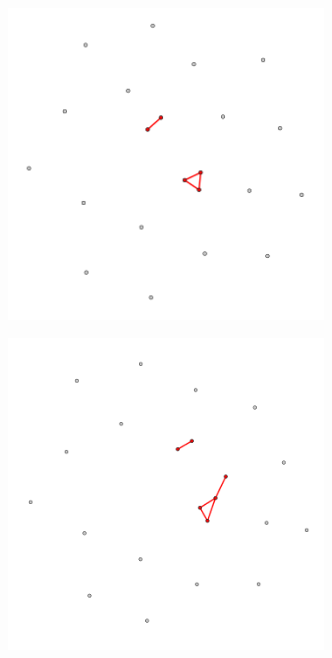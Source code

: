 \begin{figure}[!htbp]
\begin{subfigure}{0.3\textwidth}
        \caption{}
        \label{fig:temporal net B}
    \end{subfigure}
    \hfill
    \begin{subfigure}{0.3\textwidth}
        \centering
        \includegraphics[width=0.92\textwidth]{figures/temporal/2.png}
        \caption{}
        \label{fig:temporal net C}
    \end{subfigure}
    \hfill
    \begin{subfigure}{0.3\textwidth}
        \centering
        \includegraphics[width=0.92\textwidth]{figures/temporal/3.png}

\end{subfigure}
\end{figure}
